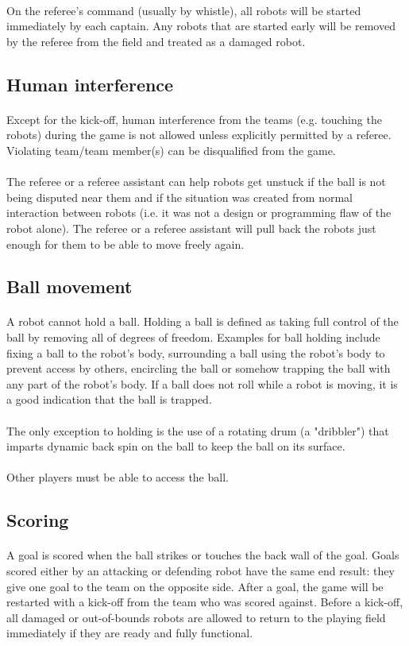 \documentclass{article}
\newcommand*{\p}{\paragraph{}}
\begin{document}
\p On the referee's command (usually by whistle), all robots will be started
immediately by each captain. Any robots that are started early will be removed
by the referee from the field and treated as a damaged robot.

\subsection{Human interference\label{ref-005}}

\p Except for the kick-off, human interference from the teams (e.g. touching the
robots) during the game is not allowed unless explicitly permitted by a
referee. Violating team/team member(s) can be disqualified from the game.

\p The referee or a referee assistant can help robots get unstuck if the ball
is not being disputed near them and if the situation was created from normal
interaction between robots (i.e. it was not a design or programming flaw of
the robot alone). The referee or a referee assistant will pull back the robots
just enough for them to be able to move freely again.

\subsection{Ball movement \label{ref-ball-movement}}

\p A robot cannot hold a ball. Holding a ball is defined as taking full control
of the ball by removing all of degrees of freedom. Examples for ball holding
include fixing a ball to the robot's body, surrounding a ball using the robot's
body to prevent access by others, encircling the ball or somehow trapping the
ball with any part of the robot's body. If a ball does not roll while a robot is
moving, it is a good indication that the ball is trapped.

\p The only exception to holding is the use of a rotating drum (a "dribbler") that
imparts dynamic back spin on the ball to keep the ball on its surface.

\p Other players must be able to access the ball.

\subsection{Scoring \label{ref-007}}

\p A goal is scored when the ball strikes or touches the back wall of the goal.
Goals scored either by an attacking or defending robot have the same end
result: they give one goal to the team on the opposite side. After a goal, the
game will be restarted with a kick-off from the team who was scored against.
Before a kick-off, all damaged or out-of-bounds robots are allowed to return to
the playing field immediately if they are ready and fully functional.
\end{document}
